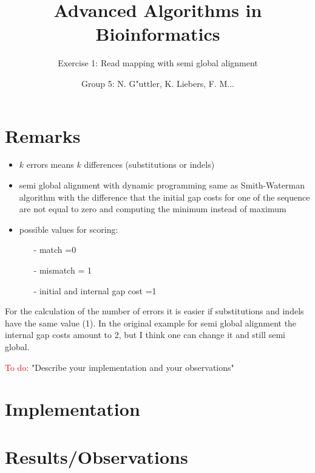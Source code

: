 \documentclass[11pt, notitlepage]{scrartcl}
\begin{document}
         


\title{Advanced Algorithms in Bioinformatics} 
\subtitle{Exercise 1: Read mapping with semi global alignment}
\author{Group 5: N. G"uttler, K. Liebers, F. M...}
\maketitle

\section*{Remarks}
\begin{itemize}
	\item $k$ errors means $k$ differences (substitutions or indels)
	\item semi global alignment with dynamic programming same as Smith-Waterman algorithm with the difference that the initial gap costs for one of the sequence are not equal to zero and computing the minimum instead of maximum
	\item possible values for scoring:
	
\begin{itemize}
	\item [-] match =0
	\item [-] mismatch = 1
	\item [-] initial and internal gap cost =1
\end{itemize}
	\end{itemize}
	
	For the calculation of the number of errors it is easier if substitutions and indels have the same value (1). In the original example for semi global alignment the internal gap costs amount to 2, but I think one can change it and still semi global.
	

\textcolor{red}{To do}: "Describe your implementation and your observations"
\section{Implementation}
\section{Results/Observations}
\end{document}
